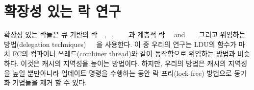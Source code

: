 \newpage
\section{확장성 있는 락 연구}
\label{sec:lockrelated}

확장성 있는 락들은 큐 기반의 락~\cite{MellorCrummey1991MCS}~\cite{Magnusson1994QLC},
~\cite{Wang2016BeMyGuest},
~\cite{Scott2013SS}
~\cite{Bueso2014MCS}~\cite{Bueso2015STP}과 계층적 락~\cite{Radovic2003HBL}~\cite{Chabbi2016CLL} and
~\cite{Luchangco2006HCQ}
~\cite{Chabbi2015HPL} 그리고 위임하는 방법(delegation
techniques)~\cite{Hendler2010FC}~\cite{Fatourou2012RCS}~\cite{Delegation2014}을 사용한다.
이 중 우리의 연구는 LDU의  함수가 마치 FC의 컴파이너 쓰레드(combiner thread)와 같이
동작함으로 위임하는 방법과 비슷하다. 이것은 캐시의 지역성을 높이는 방법이다.
하지만, 우리의 방법은 캐시의 지역성을 높일 뿐만아니라 업데이트 명령을
 수행하는 동안 락 프리(lock-free) 방법으로 동기화 기법들을 제거 할 수 있다. 



